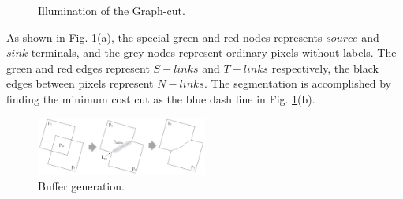 \documentclass[journal]{IEEEtran}
\begin{document}
\begin{figure}[!t]
	\centering
	\caption{Illumination of the Graph-cut.}
	\label{fig:graphcut}
\end{figure}
As shown in Fig. \ref{fig:graphcut}(a), the special green and red nodes represents $source$ and $sink$ terminals, and the grey nodes represent ordinary pixels without labels. The green and red edges represent $S-links$ and $T-links$ respectively, the black edges between pixels represent $N-links$. The segmentation is accomplished by finding the minimum cost cut as the blue dash line in Fig. \ref{fig:graphcut}(b).\par
\begin{figure}[!t]
	\centering
	\includegraphics[width=0.5\textwidth]{buffer}
	\caption{Buffer generation.}
	\label{fig:buffer}
\end{figure}
\end{document}
